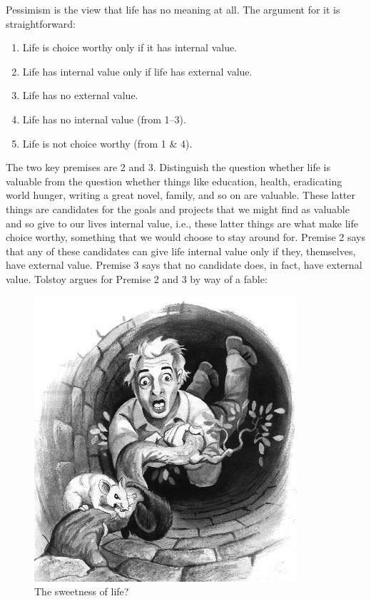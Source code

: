 \documentclass[9pt]{article}
\providecommand{\tightlist}{%
  \setlength{\itemsep}{0pt}\setlength{\parskip}{0pt}}
\begin{document}
Pessimism is the view that life has no meaning at all. The argument for
it is straightforward:

\begin{enumerate}
\def\labelenumi{\arabic{enumi}.}
\tightlist
\item
  Life is choice worthy only if it has internal value.
\item
  Life has internal value only if life has external value.
\item
  Life has no external value.
\item
  Life has no internal value (from 1--3).
\item
  Life is not choice worthy (from 1 \& 4).
\end{enumerate}

The two key premises are 2 and 3. Distinguish the question whether life
is valuable from the question whether things like education, health,
eradicating world hunger, writing a great novel, family, and so on are
valuable. These latter things are candidates for the goals and projects
that we might find as valuable and so give to our lives internal value,
i.e., these latter things are what make life choice worthy, something
that we would choose to stay around for. Premise 2 says that any of
these candidates can give life internal value only if they, themselves,
have external value. Premise 3 says that no candidate does, in fact,
have external value. Tolstoy argues for Premise 2 and 3 by way of a
fable:

\begin{figure}[htbp]
\centering
\includegraphics{Tolstoy.jpg}
\caption{The sweetness of life?}
\end{figure}
\end{document}
